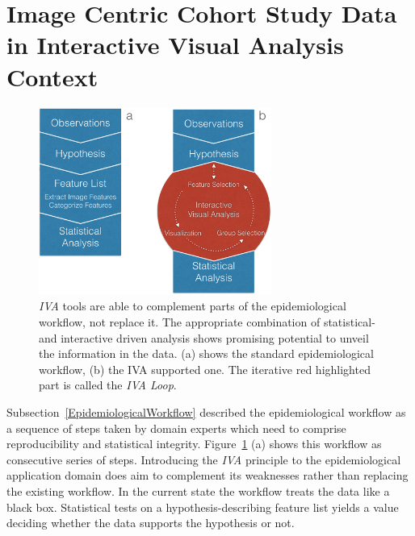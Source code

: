 \documentclass[journal]{style/vgtc} 			          %
\begin{document}
\section{Image Centric Cohort Study Data in Interactive Visual Analysis Context} \label{Image Centric Cohort Study Data in Interactive Visual Analysis Context}
\begin{figure}[htb]
 \centering
 \includegraphics[width=3.0in]{figures/workflow_comparison}
 \caption{\emph{IVA} tools are able to complement parts of the epidemiological workflow, not replace it. The appropriate combination of statistical- and interactive driven analysis shows promising potential to unveil the information in the data. (a) shows the standard epidemiological workflow, (b) the IVA supported one. The iterative red highlighted part is called the \emph{IVA Loop}.}
  \label{fig:WorkflowComparison}
\end{figure}
%
Subsection~\ref{EpidemiologicalWorkflow} described the epidemiological workflow as a sequence of steps taken by domain experts which need to comprise reproducibility and statistical integrity.
%
Figure~\ref{fig:WorkflowComparison} (a) shows this workflow as consecutive series of steps.
%
Introducing the \emph{IVA} principle to the epidemiological application domain does aim to complement its weaknesses rather than replacing the existing workflow.
%
In the current state the workflow treats the data like a black box.
%
Statistical tests on a hypothesis-describing feature list yields a value deciding whether the data supports the hypothesis or not.
\end{document}
